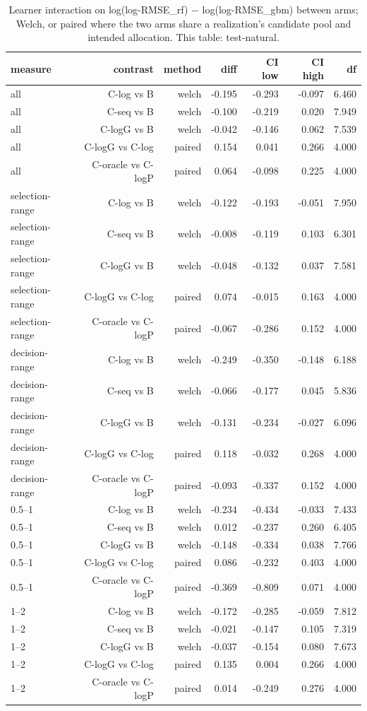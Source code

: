 \begin{table}[htbp]
\centering
\caption{Learner interaction on log(log-RMSE\_rf) − log(log-RMSE\_gbm) between arms; Welch, or paired where the two arms share a realization's candidate pool and intended allocation. This table: test-natural.}
\label{tab:rep:interactions:test-natural}
\begin{tabular}{lrrrrrr}
\toprule
measure & contrast & method & diff & CI low & CI high & df \\
\midrule
all & C-log vs B & welch & -0.195 & -0.293 & -0.097 & 6.460 \\
all & C-seq vs B & welch & -0.100 & -0.219 & 0.020 & 7.949 \\
all & C-logG vs B & welch & -0.042 & -0.146 & 0.062 & 7.539 \\
all & C-logG vs C-log & paired & 0.154 & 0.041 & 0.266 & 4.000 \\
all & C-oracle vs C-logP & paired & 0.064 & -0.098 & 0.225 & 4.000 \\
selection-range & C-log vs B & welch & -0.122 & -0.193 & -0.051 & 7.950 \\
selection-range & C-seq vs B & welch & -0.008 & -0.119 & 0.103 & 6.301 \\
selection-range & C-logG vs B & welch & -0.048 & -0.132 & 0.037 & 7.581 \\
selection-range & C-logG vs C-log & paired & 0.074 & -0.015 & 0.163 & 4.000 \\
selection-range & C-oracle vs C-logP & paired & -0.067 & -0.286 & 0.152 & 4.000 \\
decision-range & C-log vs B & welch & -0.249 & -0.350 & -0.148 & 6.188 \\
decision-range & C-seq vs B & welch & -0.066 & -0.177 & 0.045 & 5.836 \\
decision-range & C-logG vs B & welch & -0.131 & -0.234 & -0.027 & 6.096 \\
decision-range & C-logG vs C-log & paired & 0.118 & -0.032 & 0.268 & 4.000 \\
decision-range & C-oracle vs C-logP & paired & -0.093 & -0.337 & 0.152 & 4.000 \\
0.5–1 & C-log vs B & welch & -0.234 & -0.434 & -0.033 & 7.433 \\
0.5–1 & C-seq vs B & welch & 0.012 & -0.237 & 0.260 & 6.405 \\
0.5–1 & C-logG vs B & welch & -0.148 & -0.334 & 0.038 & 7.766 \\
0.5–1 & C-logG vs C-log & paired & 0.086 & -0.232 & 0.403 & 4.000 \\
0.5–1 & C-oracle vs C-logP & paired & -0.369 & -0.809 & 0.071 & 4.000 \\
1–2 & C-log vs B & welch & -0.172 & -0.285 & -0.059 & 7.812 \\
1–2 & C-seq vs B & welch & -0.021 & -0.147 & 0.105 & 7.319 \\
1–2 & C-logG vs B & welch & -0.037 & -0.154 & 0.080 & 7.673 \\
1–2 & C-logG vs C-log & paired & 0.135 & 0.004 & 0.266 & 4.000 \\
1–2 & C-oracle vs C-logP & paired & 0.014 & -0.249 & 0.276 & 4.000 \\
\bottomrule
\end{tabular}
\end{table}
